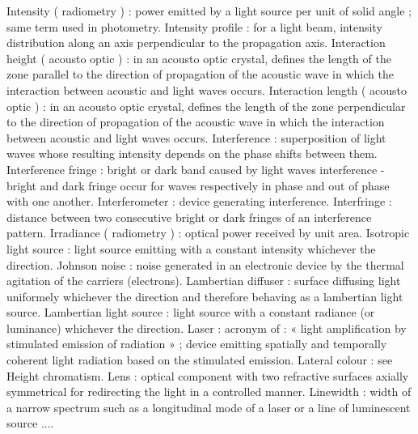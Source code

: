 Intensity ( radiometry )                             : power emitted by a light source per unit of solid angle ; same term used in photometry.
Intensity profile                                    : for a light beam, intensity distribution along an axis perpendicular to the propagation axis.
Interaction height ( acousto optic )                 : in an acousto optic crystal, defines the length of the zone parallel to the direction of propagation of the acoustic wave in which the interaction between acoustic and light waves occurs.
Interaction length ( acousto optic )                 : in an acousto optic crystal, defines the length of the zone perpendicular to the direction of propagation of the acoustic wave in which the interaction between acoustic and light waves occurs.
Interference                                         : superposition of light waves whose resulting intensity depends on the phase shifts between them.
Interference fringe                                  : bright or dark band caused by light waves interference - bright and dark fringe occur for waves respectively in phase and out of phase with one another.
Interferometer                                       : device generating interference.
Interfringe                                          : distance between two consecutive bright or dark fringes of an interference pattern.
Irradiance ( radiometry )                            : optical power received by unit area.
Isotropic light source                               : light source emitting with a constant intensity whichever the direction.
Johnson noise                                        : noise generated in an electronic device by the thermal agitation of the carriers (electrons).
Lambertian diffuser                                  : surface diffusing light uniformely whichever the direction and therefore behaving as a lambertian light source.
Lambertian light source                              : light source with a constant radiance (or luminance) whichever the direction.
Laser                                                : acronym of                                   : « light amplification by stimulated emission of radiation » ; device emitting spatially and temporally coherent light radiation based on the stimulated emission.
Lateral colour                                       : see Height chromatism.
Lens                                                 : optical component with two refractive surfaces axially symmetrical for redirecting the light in a controlled manner.
Linewidth                                            : width of a narrow spectrum such as a longitudinal mode of a laser or a line of luminescent source ....
